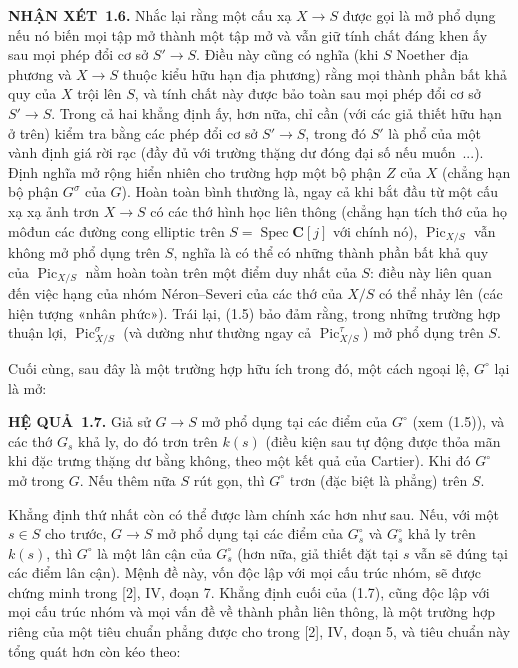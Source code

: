 \documentclass[11pt,twoside,openany]{book}
\numberwithin{equation}{section}
\newcommand{\src}[1]{%
  \phantomsection\hypertarget{src:\fgasourceid:#1}{}%
  \marginpar{\raggedleft\footnotesize\sffamily #1}%
}
\newcommand{\fgasourceid}{unset}
\newcommand{\result}[2]{\par\medskip\noindent\textbf{#1\if\relax\detokenize{#2}\relax\else\ #2\fi.}\quad}
\begin{document}
\result{NHẬN XÉT}{1.6} Nhắc lại rằng một cấu xạ $X\longrightarrow S$ được gọi
là mở phổ dụng nếu nó biến mọi tập mở thành một tập mở và vẫn giữ tính chất
đáng khen ấy sau mọi phép đổi cơ sở $S'\longrightarrow S$. Điều này cũng có
nghĩa (khi $S$ Noether địa phương và $X\longrightarrow S$ thuộc kiểu hữu hạn
địa phương) rằng mọi thành phần bất khả quy của $X$ trội lên $S$, và tính chất
này được bảo toàn sau mọi phép đổi cơ sở $S'\longrightarrow S$. Trong cả hai
khẳng định ấy, hơn nữa, chỉ cần (với các giả thiết hữu hạn ở trên) kiểm tra
bằng các phép đổi cơ sở $S'\longrightarrow S$, trong đó $S'$ là phổ của một
vành định giá rời rạc (đầy đủ với trường thặng dư đóng đại số nếu muốn~...).
Định nghĩa mở rộng hiển nhiên cho trường hợp một bộ phận $Z$ của $X$ (chẳng
hạn bộ phận $G^\sigma$ của $G$). Hoàn toàn bình thường là, ngay cả khi bắt đầu
từ một cấu xạ xạ ảnh trơn $X\longrightarrow S$ có các thớ hình học liên thông
(chẳng hạn tích thớ của họ môđun các đường cong elliptic trên
$S=\operatorname{Spec}\mathbf C[j]$ với chính nó),
$\operatorname{Pic}_{X/S}$ vẫn không mở phổ dụng trên $S$, nghĩa là có thể có
những thành phần bất khả quy của $\operatorname{Pic}_{X/S}$ nằm hoàn toàn
trên một điểm duy nhất của $S$: điều này liên quan đến việc hạng của nhóm
Néron--Severi của các thớ của $X/S$ có thể nhảy lên (các hiện tượng «nhân
phức»). Trái lại, (1.5) bảo đảm rằng, trong những trường hợp thuận lợi,
$\operatorname{Pic}_{X/S}^\sigma$ (và dường như thường ngay cả
$\operatorname{Pic}_{X/S}^\tau$) mở phổ dụng trên $S$.
\src{229}
Cuối cùng, sau đây là một trường hợp hữu ích trong đó, một cách ngoại lệ,
$G^\circ$ lại là mở:

\result{HỆ QUẢ}{1.7} Giả sử $G\longrightarrow S$ mở phổ dụng tại các điểm của
$G^\circ$ (xem (1.5)), và các thớ $G_s$ khả ly, do đó trơn trên $k(s)$ (điều
kiện sau tự động được thỏa mãn khi đặc trưng thặng dư bằng không, theo một kết
quả của Cartier). Khi đó $G^\circ$ mở trong $G$. Nếu thêm nữa $S$ rút gọn, thì
$G^\circ$ trơn (đặc biệt là phẳng) trên $S$.

Khẳng định thứ nhất còn có thể được làm chính xác hơn như sau. Nếu, với một
$s\in S$ cho trước, $G\longrightarrow S$ mở phổ dụng tại các điểm của
$G_s^\circ$ và $G_s^\circ$ khả ly trên $k(s)$, thì $G^\circ$ là một lân cận
của $G_s^\circ$ (hơn nữa, giả thiết đặt tại $s$ vẫn sẽ đúng tại các điểm lân
cận). Mệnh đề này, vốn độc lập với mọi cấu trúc nhóm, sẽ được chứng minh trong
[2], IV, đoạn 7. Khẳng định cuối của (1.7), cũng độc lập với mọi cấu trúc nhóm
và mọi vấn đề về thành phần liên thông, là một trường hợp riêng của một tiêu
chuẩn phẳng được cho trong [2], IV, đoạn 5, và tiêu chuẩn này tổng quát hơn còn
kéo theo:
\end{document}
